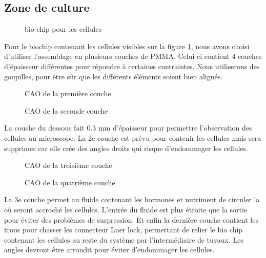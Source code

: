 \documentclass[a4paper, 11pt]{article}
\begin{document}
\subsection{Zone de culture}
\begin{figure}[H]
    \centering
    \caption{bio-chip pour les cellules}
    \label{fig:CAO_cellule}
\end{figure}
Pour le biochip contenant les cellules visibles sur la figure \ref{fig:CAO_cellule}, nous avons choisi d'utiliser l'assemblage en plusieurs couches de PMMA.
Celui-ci contient 4 couches d'épaisseur différentes pour répondre à certaines contraintes.
Nous utiliserons des goupilles, pour être sûr que les différents éléments soient bien alignés.
\begin{multicols}{2}
    \begin{figure}[H]
        \centering
        \caption{CAO de la première couche}
        \label{fig:CAO_cellule_couche1}
    \end{figure}
    \begin{figure}[H]
        \centering
        \caption{CAO de la seconde couche}
        \label{fig:CAO_cellule_couche2}
    \end{figure}
\end{multicols}
La couche du dessous fait 0.3 mm d'épaisseur pour permettre l'observation des cellules au microscope.
La 2e couche est prévu pour contenir les cellules mais sera supprimer car elle crée des angles droits qui risque d'endommager les cellules.
\begin{multicols}{2}
    \begin{figure}[H]
        \centering
        \caption{CAO de la troisième couche}
        \label{fig:CAO_cellule_couche3}
    \end{figure}
    \begin{figure}[H]
        \centering
        \caption{CAO de la quatrième couche}
        \label{fig:CAO_cellule_couche4}
    \end{figure}
\end{multicols}
La 3e couche permet au fluide contenant les hormones et nutriment de circuler la où seront accroché les cellules.
L'entrée du fluide est plus étroite que la sortie pour éviter des problèmes de surpression.
Et enfin la dernière couche contient les trous pour chasser les connecteur Luer lock, permettant de relier le bio chip contenant les cellules au reste du système par l'intermédiaire de tuyaux.
Les angles devront être arrondit pour éviter d'endommager les cellules.
\end{document}
